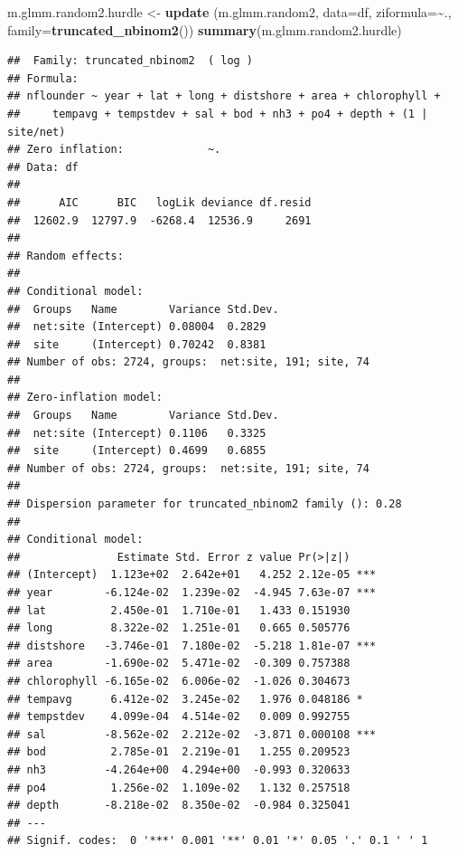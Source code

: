 \documentclass[
]{article}
\newenvironment{Shaded}{\begin{snugshade}}{\end{snugshade}}
\newcommand{\AttributeTok}[1]{\textcolor[rgb]{0.13,0.29,0.53}{#1}}
\newcommand{\FunctionTok}[1]{\textcolor[rgb]{0.13,0.29,0.53}{\textbf{#1}}}
\newcommand{\NormalTok}[1]{#1}
\newcommand{\OtherTok}[1]{\textcolor[rgb]{0.56,0.35,0.01}{#1}}
\newcommand{\SpecialCharTok}[1]{\textcolor[rgb]{0.81,0.36,0.00}{\textbf{#1}}}
\begin{document}
\begin{Shaded}
\begin{Highlighting}[]
\NormalTok{m.glmm.random2.hurdle }\OtherTok{\textless{}{-}} \FunctionTok{update}\NormalTok{ (m.glmm.random2,}
                                 \AttributeTok{data=}\NormalTok{df,}
                                 \AttributeTok{ziformula=}\SpecialCharTok{\textasciitilde{}}\NormalTok{.,}
                                 \AttributeTok{family=}\FunctionTok{truncated\_nbinom2}\NormalTok{())}
\FunctionTok{summary}\NormalTok{(m.glmm.random2.hurdle)}
\end{Highlighting}
\end{Shaded}

\begin{verbatim}
##  Family: truncated_nbinom2  ( log )
## Formula:          
## nflounder ~ year + lat + long + distshore + area + chlorophyll +  
##     tempavg + tempstdev + sal + bod + nh3 + po4 + depth + (1 |      site/net)
## Zero inflation:             ~.
## Data: df
## 
##      AIC      BIC   logLik deviance df.resid 
##  12602.9  12797.9  -6268.4  12536.9     2691 
## 
## Random effects:
## 
## Conditional model:
##  Groups   Name        Variance Std.Dev.
##  net:site (Intercept) 0.08004  0.2829  
##  site     (Intercept) 0.70242  0.8381  
## Number of obs: 2724, groups:  net:site, 191; site, 74
## 
## Zero-inflation model:
##  Groups   Name        Variance Std.Dev.
##  net:site (Intercept) 0.1106   0.3325  
##  site     (Intercept) 0.4699   0.6855  
## Number of obs: 2724, groups:  net:site, 191; site, 74
## 
## Dispersion parameter for truncated_nbinom2 family (): 0.28 
## 
## Conditional model:
##               Estimate Std. Error z value Pr(>|z|)    
## (Intercept)  1.123e+02  2.642e+01   4.252 2.12e-05 ***
## year        -6.124e-02  1.239e-02  -4.945 7.63e-07 ***
## lat          2.450e-01  1.710e-01   1.433 0.151930    
## long         8.322e-02  1.251e-01   0.665 0.505776    
## distshore   -3.746e-01  7.180e-02  -5.218 1.81e-07 ***
## area        -1.690e-02  5.471e-02  -0.309 0.757388    
## chlorophyll -6.165e-02  6.006e-02  -1.026 0.304673    
## tempavg      6.412e-02  3.245e-02   1.976 0.048186 *  
## tempstdev    4.099e-04  4.514e-02   0.009 0.992755    
## sal         -8.562e-02  2.212e-02  -3.871 0.000108 ***
## bod          2.785e-01  2.219e-01   1.255 0.209523    
## nh3         -4.264e+00  4.294e+00  -0.993 0.320633    
## po4          1.256e-02  1.109e-02   1.132 0.257518    
## depth       -8.218e-02  8.350e-02  -0.984 0.325041    
## ---
## Signif. codes:  0 '***' 0.001 '**' 0.01 '*' 0.05 '.' 0.1 ' ' 1

\end{verbatim}
\end{document}
